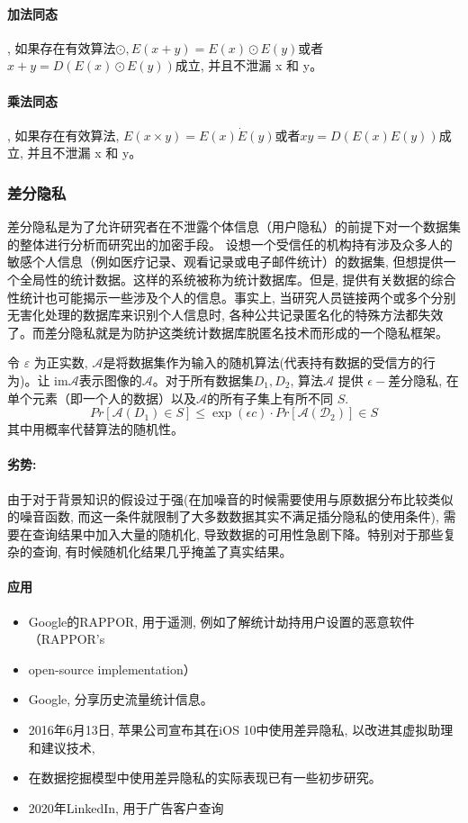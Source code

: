 \documentclass[a4paper]{article}
\begin{document}
\paragraph{加法同态}, 如果存在有效算法$\odot$$, E(x+y)=E(x)\odot E(y)$或者$ x+y=D(E(x)\odot E(y))$成立, 并且不泄漏 x 和 y。
\paragraph{乘法同态}, 如果存在有效算法, $E(x \times y)=E(x) \dot E(y)$或者$ xy=D(E(x) E(y))$成立, 并且不泄漏 x 和 y。



\subsubsection{差分隐私} 
差分隐私是为了允许研究者在不泄露个体信息（用户隐私）的前提下对一个数据集的整体进行分析而研究出的加密手段。\cite{DPDwork2008}
设想一个受信任的机构持有涉及众多人的敏感个人信息（例如医疗记录、观看记录或电子邮件统计）的数据集, 但想提供一个全局性的统计数据。这样的系统被称为统计数据库。但是, 提供有关数据的综合性统计也可能揭示一些涉及个人的信息。事实上, 当研究人员链接两个或多个分别无害化处理的数据库来识别个人信息时, 各种公共记录匿名化的特殊方法都失效了。而差分隐私就是为防护这类统计数据库脱匿名技术而形成的一个隐私框架。

令 $\varepsilon$ 为正实数, $\mathcal{A}$是将数据集作为输入的随机算法(代表持有数据的受信方的行为)。让 $\textrm{im}\mathcal{A}$表示图像的$\mathcal {A}$。对于所有数据集$D_{1}, D_{2}$, 
算法$\mathcal{A}$ 提供 $\epsilon-$差分隐私, 在单个元素（即一个人的数据）以及$\mathcal{A}$的所有子集上有所不同 $S$. 
$$ Pr [ \mathcal{A}(D_1) \in S ] \leqslant \exp(\epsilon c) \cdot Pr [ \mathcal{A(D_2)} ] \in S  $$
其中用概率代替算法的随机性。 
  
\paragraph{劣势:}由于对于背景知识的假设过于强(在加噪音的时候需要使用与原数据分布比较类似的噪音函数, 而这一条件就限制了大多数数据其实不满足插分隐私的使用条件), 需要在查询结果中加入大量的随机化, 导致数据的可用性急剧下降。特别对于那些复杂的查询, 有时候随机化结果几乎掩盖了真实结果。
\paragraph{应用}
\begin{itemize}
    \item Google的RAPPOR, 用于遥测, 例如了解统计劫持用户设置的恶意软件（RAPPOR's \item open-source implementation）
    \item Google, 分享历史流量统计信息。
    \item 2016年6月13日, 苹果公司宣布其在iOS 10中使用差异隐私, 以改进其虚拟助理和建议技术,  
    \item 在数据挖掘模型中使用差异隐私的实际表现已有一些初步研究。\citep{FLETCHER201716}
    \item 2020年LinkedIn, 用于广告客户查询
\end{itemize}
\end{document}
